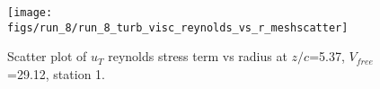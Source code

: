 \begin{figure}[H]
\centering
\texttt{[image: figs/run\_8/run\_8\_turb\_visc\_reynolds\_vs\_r\_meshscatter]}
\caption{Scatter plot of $
u_T$ reynolds stress term vs radius at $z/c$=5.37, $V_{free}$=29.12, station 1.}
\label{fig:run_8_turb_visc_reynolds_vs_r_meshscatter}
\end{figure}


